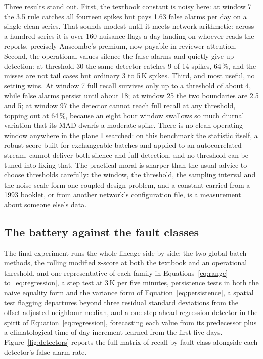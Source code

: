 Three results stand out. First, the textbook constant is noisy here: at
window 7 the 3.5 rule catches all fourteen spikes but pays 1.63 false alarms
per day on a single clean series. That sounds modest until it meets network
arithmetic: across a hundred series it is over 160 nuisance flags a day
landing on whoever reads the reports, precisely Anscombe's premium, now
payable in reviewer attention. Second, the operational values silence the
false alarms and quietly give up detection: at threshold 30 the same
detector catches 9 of 14 spikes, 64\,\%, and the misses are not tail cases
but ordinary 3 to 5\,K spikes. Third, and most useful, no setting wins. At
window 7 full recall survives only up to a threshold of about 4, while
false alarms persist until about 18; at window 25 the two boundaries are
2.5 and 5; at window 97 the detector cannot reach full recall at any
threshold, topping out at 64\,\%, because an eight hour window swallows so
much diurnal variation that its MAD dwarfs a moderate spike. There is no
clean operating window anywhere in the plane I searched: on this benchmark
the statistic itself, a robust score built for exchangeable batches and
applied to an autocorrelated stream, cannot deliver both silence and full
detection, and no threshold can be tuned into fixing that. The practical
moral is sharper than the usual advice to choose thresholds carefully: the
window, the threshold, the sampling interval and the noise scale form one
coupled design problem, and a constant carried from a 1993 booklet, or from
another network's configuration file, is a measurement about someone else's
data.

\subsection{The battery against the fault classes}
\label{sec:exp-battery}

The final experiment runs the whole lineage side by side: the two global
batch methods, the rolling modified z-score at both the textbook and an
operational threshold, and one representative of each family in
Equations~\eqref{eq:range} to~\eqref{eq:regression}, a step test at 3\,K per
five minutes, persistence tests in both the naive equality form and the
variance form of Equation~\eqref{eq:persistence}, a spatial test flagging
departures beyond three residual standard deviations from the offset-adjusted
neighbour median, and a one-step-ahead regression detector in the spirit of
Equation~\eqref{eq:regression}, forecasting each value from its predecessor
plus a climatological time-of-day increment learned from the first five
days. Figure~\ref{fig:detectors} reports the full matrix of recall by fault
class alongside each detector's false alarm rate.


